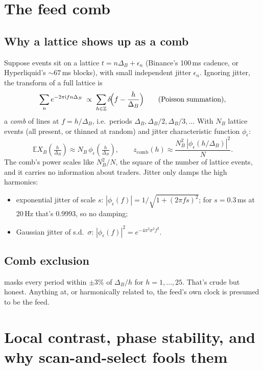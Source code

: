 \documentclass[11pt,a4paper]{article}
\newcommand{\code}[1]{\texttt{\detokenize{#1}}}
\newcommand{\E}{\mathbb{E}}
\newcommand{\ii}{\mathrm{i}}
\begin{document}
\section{The feed comb}\label{sec:comb}

\subsection{Why a lattice shows up as a comb}
Suppose events sit on a lattice $t=n\Delta_B+\epsilon_n$ (Binance's 100\,ms cadence, or Hyperliquid's $\sim\!67$\,ms blocks), with
small independent jitter $\epsilon_n$. Ignoring jitter, the transform of a full lattice is
\begin{equation}
  \sum_{n} e^{-2\pi\ii f n\Delta_B} \;\propto\; \sum_{h\in\mathbb Z}\delta\!\Bigl(f-\frac{h}{\Delta_B}\Bigr)
  \qquad\text{(Poisson summation)},
\end{equation}
a \emph{comb} of lines at $f=h/\Delta_B$, i.e.\ periods $\Delta_B, \Delta_B/2,\Delta_B/3,\dots$ With $N_B$ lattice events (all present, or
thinned at random) and jitter characteristic function $\phi_\epsilon$:
\begin{equation}\label{eq:comb}
  \E X_B\!\left(\tfrac{h}{\Delta_B}\right)\approx N_B\,\phi_\epsilon\!\left(\tfrac{h}{\Delta_B}\right),\qquad
  z_{\mathrm{comb}}(h)\approx \frac{N_B^2\,|\phi_\epsilon(h/\Delta_B)|^2}{N}.
\end{equation}
The comb's power scales like $N_B^2/N$, the square of the number of lattice events, and it carries no information about traders.
Jitter only damps the high harmonics:
\begin{itemize}
  \item exponential jitter of scale $s$: $|\phi_\epsilon(f)|=1/\sqrt{1+(2\pi fs)^2}$; for $s=0.3$\,ms at 20\,Hz that's $0.9993$, so no damping;
  \item Gaussian jitter of s.d.\ $\sigma$: $|\phi_\epsilon(f)|^2=e^{-4\pi^2\sigma^2f^2}$.
\end{itemize}

\subsection{Comb exclusion}
\code{comb_keep_mask} masks every period within $\pm3\%$ of $\Delta_B/h$ for $h=1,\dots,25$. That's crude but honest. Anything at, or harmonically
related to, the feed's own clock is presumed to be the feed.

\section{Local contrast, phase stability, and why scan-and-select fools them}\label{sec:select}
\end{document}
